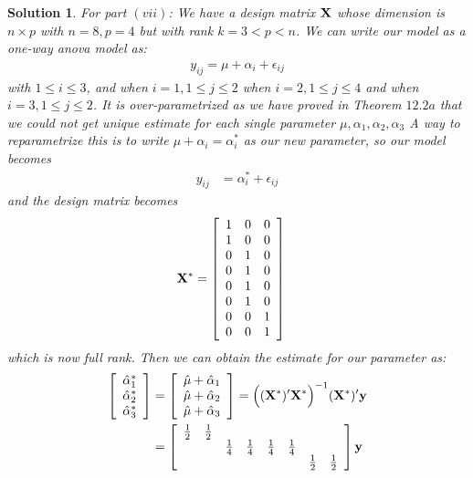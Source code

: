 \documentclass[11pt]{article}
\newtheorem{sol}{Solution}
\begin{document}
\begin{sol}
	For part $(vii)$:\vskip 2mm
	We have a design matrix ${\bf X}$ whose dimension is $n \times p$ with $n = 8, p = 4$ but with rank $k = 3 < p < n$. We can write our model as a one-way anova model as:
	\begin{align*}
		y_{ij} = \mu + \alpha_{i} + \epsilon_{ij}
	\end{align*}
	with $1 \leq i \leq 3$, and when $i = 1, 1 \leq j \leq 2$ when $i = 2, 1 \leq j \leq 4$ and when $i = 3, 1 \leq j \leq 2$.\vskip 2mm
	It is over-parametrized as we have proved in Theorem $12.2a$ that we could not get unique estimate for each single parameter $\mu, \alpha_1, \alpha_2, \alpha_3$\vskip 2mm
	A way to reparametrize this is to write $\mu + \alpha_i = \alpha_i^{\ast}$ as our new parameter, so our model becomes
	\begin{align*}
		y_{ij} &= \alpha_i^{\ast} + \epsilon_{ij}
	\end{align*}
	and the design matrix becomes
	\begin{align*}
		{\bf X}^{\ast} &= \left[\begin{array}{ccc} 1 &0 &0\\ 1&0&0\\ 0&1&0\\ 0&1&0\\ 0&1&0\\ 0&1&0\\0 &0&1\\ 0&0&1\end{array}\right]
	\end{align*}
	which is now full rank.\vskip 2mm
	Then we can obtain the estimate for our parameter as:
	\begin{align*}
		\left[\begin{array}{c} \hat{\alpha}^{\ast}_1\\ \hat{\alpha}^{\ast}_2\\ \hat{\alpha}^{\ast}_3\end{array}\right]
		&= \left[\begin{array}{c} \hat{\mu} +  \hat{\alpha}_1\\ \hat{\mu} + \hat{\alpha}_2\\ \hat{\mu} + \hat{\alpha}_3\end{array}\right] = \Big(({\bf X}^{\ast})'{\bf X}^{\ast}\Big)^{-1}({\bf X}^{\ast})'{\bf y}\\
		&= \left[\begin{array}{cccccccc} \frac{1}{2}&\frac{1}{2}&&&&&&\\ &&\frac{1}{4}&\frac{1}{4}&\frac{1}{4}&\frac{1}{4}&&\\ &&&&&&\frac{1}{2}&\frac{1}{2}\end{array}\right]{\bf y}\\

\end{align*}
\end{sol}
\end{document}
